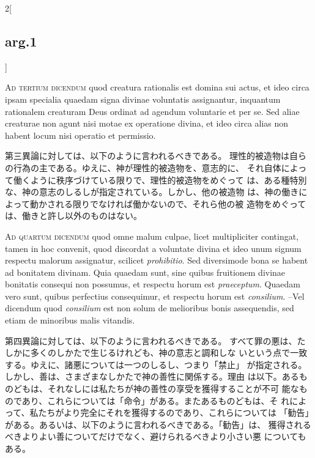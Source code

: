 \documentclass[paper=a4paper,fontsize=10pt,jafontsize=9pt,titlepage]{jlreq}
\begin{document}
\begin{paracol}{2}[\subsection{arg.1}]
\switchcolumn*[\subsection{ad.3}]


{\scshape Ad tertium dicendum} quod creatura rationalis
est domina sui actus, et ideo circa ipsam specialia quaedam signa
divinae voluntatis assignantur, inquantum rationalem creaturam Deus
ordinat ad agendum voluntarie et per se. Sed aliae creaturae non agunt
nisi motae ex operatione divina, et ideo circa alias non habent locum
nisi operatio et permissio.

\switchcolumn

第三異論に対しては、以下のように言われるべきである。
理性的被造物は自らの行為の主である。ゆえに、神が理性的被造物を、意志的に、
 それ自体によって働くように秩序づけている限りで、理性的被造物をめぐって
 は、ある種特別な、神の意志のしるしが指定されている。しかし、他の被造物
 は、神の働きによって動かされる限りでなければ働かないので、それら他の被
 造物をめぐっては、働きと許し以外のものはない。

\switchcolumn*[\subsection{ad.4}]


{\scshape Ad quartum dicendum} quod omne malum culpae, licet
 multipliciter contingat, tamen in hoc convenit, quod discordat a
 voluntate divina et ideo unum signum respectu malorum assignatur,
 scilicet {\itshape prohibitio}. Sed diversimode bona se habent ad bonitatem
 divinam. Quia quaedam sunt, sine quibus fruitionem divinae bonitatis
 consequi non possumus, et respectu horum est {\itshape praeceptum}. Quaedam vero
 sunt, quibus perfectius consequimur, et respectu horum est
 {\itshape consilium}. --Vel dicendum quod {\itshape consilium} est non solum de melioribus
 bonis assequendis, sed etiam de minoribus malis vitandis.

\switchcolumn

第四異論に対しては、以下のように言われるべきである。
すべて罪の悪は、たしかに多くのしかたで生じるけれども、神の意志と調和しな
 いという点で一致する。ゆえに、諸悪については一つのしるし、つまり「禁止」
 が指定される。しかし、善は、さまざまなしかたで神の善性に関係する。理由
 は以下。あるものどもは、それなしには私たちが神の善性の享受を獲得することが不可
 能なものであり、これらについては「命令」がある。またあるものどもは、そ
 れによって、私たちがより完全にそれを獲得するのであり、これらについては
 「勧告」がある。あるいは、以下のように言われるべきである。「勧告」は、
 獲得されるべきよりよい善についてだけでなく、避けられるべきより小さい悪
 についてもある。

\end{paracol}
\end{document}
